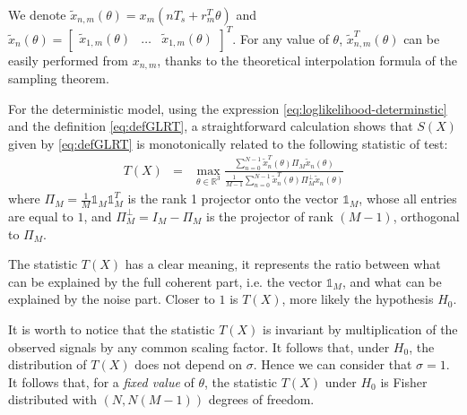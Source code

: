 \documentclass[graybox]{svmult/styles/svmult}
\def\bun{\mathds{1}}
\newcommand{\trace}[1]{\mathrm{trace}\left[ #1 \right]}
\begin{document}
We denote $\tilde x_{n,m}(\theta)=x_{m}(nT_{s}+r_{m}^{T}\theta)$ and $\tilde x_{n}(\theta)=\begin{bmatrix}
\tilde x_{1,m}(\theta)&\ldots&\tilde x_{1,m}(\theta)\end{bmatrix}^{T}$. For any  value of $\theta$, $\tilde x_{n,m}^{T}(\theta)$ can be easily performed from $x_{n,m}$, thanks to the theoretical interpolation formula of the sampling theorem.

For the deterministic model, using the expression \eqref{eq:loglikelihood-determinstic} and the definition  \eqref{eq:defGLRT},  a straightforward calculation shows that $S(X)$ given by \eqref{eq:defGLRT} is monotonically related to the following statistic of test:
\begin{eqnarray}
 \label{eq:SoT}
 T(X) &=& \max_{\theta\in\mathds{R}^{3}}
 \frac{\sum_{n=0}^{N-1}\tilde x_{n}^{T}(\theta)\Pi_{M} \tilde x_{n}(\theta)}
        {\frac{1}{M-1}\sum_{n=0}^{N-1}\tilde x_{n}^{T}(\theta)\Pi_{M}^{\perp}\tilde x_{n}(\theta)}
 \end{eqnarray}
 where $\Pi_{M}=\frac{1}{M}\bun_{M}\bun_{M}^{T}$ is the rank 1 projector onto the vector $\bun_{M}$, whose all entries are equal to $1$, and  $\Pi_{M}^{\perp}=I_{M}-\Pi_{M}$  is the  projector of rank $(M-1)$, orthogonal to $\Pi_{M}$. 


The statistic $T(X)$ has a clear meaning, it represents the ratio between what can be explained by the full coherent part, i.e. the vector $\bun_{M}$,  and what can be explained by the noise part. Closer to $1$ is $T(X)$, more likely the hypothesis $H_{0}$.

It is worth to notice that the statistic $T(X)$ is invariant by multiplication of the observed signals by any common scaling factor. It follows that, under $H_{0}$, the distribution of $T(X)$ does not depend on $\sigma$. Hence we can consider that $\sigma=1$. It follows that, for a \emph{fixed value} of $\theta$, the statistic $T(X)$ under $H_{0}$ is Fisher distributed with $(N,N(M-1))$ degrees of freedom.
\end{document}
